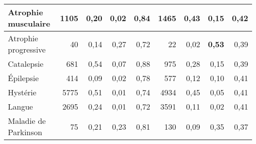 \begin{landscape}
\begin{table}[]
\begin{tabular}{|l|cccc|cccc|}
Atrophie musculaire                                    & \multicolumn{1}{r|}{1105}       & \multicolumn{1}{r|}{0,20}   & \multicolumn{1}{r|}{0,02} & \multicolumn{1}{r|}{0,84}      & \multicolumn{1}{r|}{1465}       & \multicolumn{1}{r|}{0,43}   & \multicolumn{1}{r|}{0,15} & \multicolumn{1}{r|}{0,42}      \\ \hline
Atrophie progressive                                   & \multicolumn{1}{r|}{40}         & \multicolumn{1}{r|}{0,14}   & \multicolumn{1}{r|}{0,27} & \multicolumn{1}{r|}{0,72}      & \multicolumn{1}{r|}{22}         & \multicolumn{1}{r|}{0,02}   & \multicolumn{1}{r|}{\textbf{0,53}} & \multicolumn{1}{r|}{0,39}      \\ \hline
Catalepsie                                             & \multicolumn{1}{r|}{681}        & \multicolumn{1}{r|}{0,54}   & \multicolumn{1}{r|}{0,07} & \multicolumn{1}{r|}{0,88}      & \multicolumn{1}{r|}{975}        & \multicolumn{1}{r|}{0,28}   & \multicolumn{1}{r|}{0,15} & \multicolumn{1}{r|}{0,39}      \\ \hline
Épilepsie                                              & \multicolumn{1}{r|}{414}       & \multicolumn{1}{r|}{0,09}   & \multicolumn{1}{r|}{0,02} & \multicolumn{1}{r|}{0,78}      & \multicolumn{1}{r|}{577}       & \multicolumn{1}{r|}{0,12}   & \multicolumn{1}{r|}{0,10} & \multicolumn{1}{r|}{0,41}      \\ \hline
Hystérie                                               & \multicolumn{1}{r|}{5775}       & \multicolumn{1}{r|}{0,51}   & \multicolumn{1}{r|}{0,01} & \multicolumn{1}{r|}{0,74}      & \multicolumn{1}{r|}{4934}       & \multicolumn{1}{r|}{0,45}   & \multicolumn{1}{r|}{0,05} & \multicolumn{1}{r|}{0,41}      \\ \hline
Langue                                                 & \multicolumn{1}{r|}{2695}        & \multicolumn{1}{r|}{0,24}   & \multicolumn{1}{r|}{0,01} & \multicolumn{1}{r|}{0,72}     & \multicolumn{1}{r|}{3591}       & \multicolumn{1}{r|}{0,11}   & \multicolumn{1}{r|}{0,02} & \multicolumn{1}{r|}{0,41}      \\ \hline
Maladie de Parkinson                                   & \multicolumn{1}{r|}{75}         & \multicolumn{1}{r|}{0,21}   & \multicolumn{1}{r|}{0,23} & \multicolumn{1}{r|}{0,81}     & \multicolumn{1}{r|}{130}        & \multicolumn{1}{r|}{0,09}   & \multicolumn{1}{r|}{0,35} & \multicolumn{1}{r|}{0,37}      \\ \hline

\end{tabular}
\end{table}
\end{landscape}

